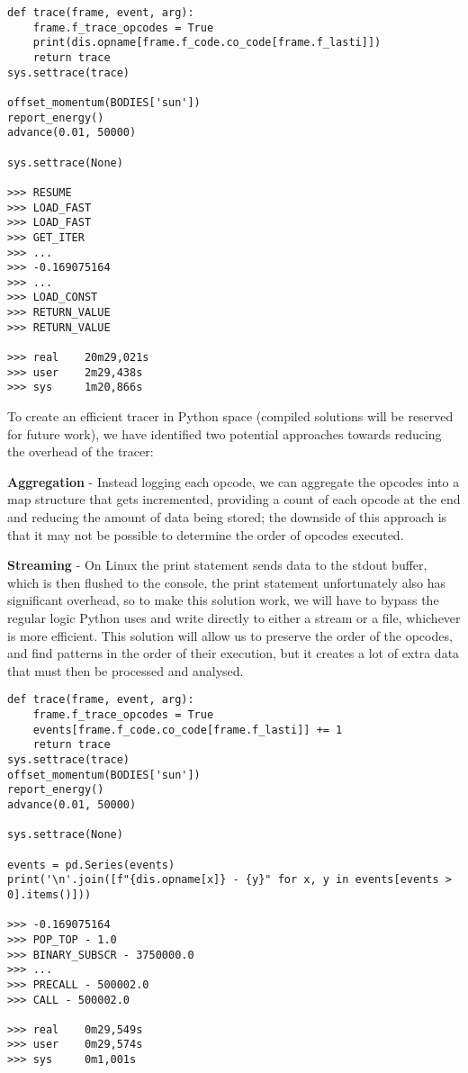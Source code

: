 \begin{lstlisting}[caption={Naive opcode printing approach},captionpos=b,label={lst:nbody-trace-orig}]
def trace(frame, event, arg):
    frame.f_trace_opcodes = True
    print(dis.opname[frame.f_code.co_code[frame.f_lasti]])
    return trace
sys.settrace(trace)

offset_momentum(BODIES['sun'])
report_energy()
advance(0.01, 50000)

sys.settrace(None)

>>> RESUME
>>> LOAD_FAST
>>> LOAD_FAST
>>> GET_ITER
>>> ...
>>> -0.169075164
>>> ...
>>> LOAD_CONST
>>> RETURN_VALUE
>>> RETURN_VALUE

>>> real    20m29,021s
>>> user    2m29,438s
>>> sys     1m20,866s
\end{lstlisting}

To create an efficient tracer in Python space (compiled solutions will be reserved for future work), we have identified
two potential approaches towards reducing the overhead of the tracer:

\textbf{Aggregation} - Instead logging each opcode, we can aggregate the opcodes into a map structure that gets
incremented, providing a count of each opcode at the end and reducing the amount of data being stored; the downside of
this approach is that it may not be possible to determine the order of opcodes executed.

\textbf{Streaming} - On Linux the print statement sends data to the stdout buffer\cite{Stdout}, which is then flushed to
the console, the print statement unfortunately also has significant overhead\cite{PythonBuiltIns}, so to make this solution
work, we will have to bypass the regular logic Python uses and write directly to either a stream or a file, whichever is
more efficient.
This solution will allow us to preserve the order of the opcodes, and find patterns in the order of their execution, but
it creates a lot of extra data that must then be processed and analysed.

\begin{lstlisting}[caption={Tracing the nbody problem using aggregation},captionpos=b,label={lst:nbody-trace-agg}]
def trace(frame, event, arg):
    frame.f_trace_opcodes = True
    events[frame.f_code.co_code[frame.f_lasti]] += 1
    return trace
sys.settrace(trace)
offset_momentum(BODIES['sun'])
report_energy()
advance(0.01, 50000)

sys.settrace(None)

events = pd.Series(events)
print('\n'.join([f"{dis.opname[x]} - {y}" for x, y in events[events > 0].items()]))

>>> -0.169075164
>>> POP_TOP - 1.0
>>> BINARY_SUBSCR - 3750000.0
>>> ...
>>> PRECALL - 500002.0
>>> CALL - 500002.0

>>> real    0m29,549s
>>> user    0m29,574s
>>> sys     0m1,001s
\end{lstlisting}

